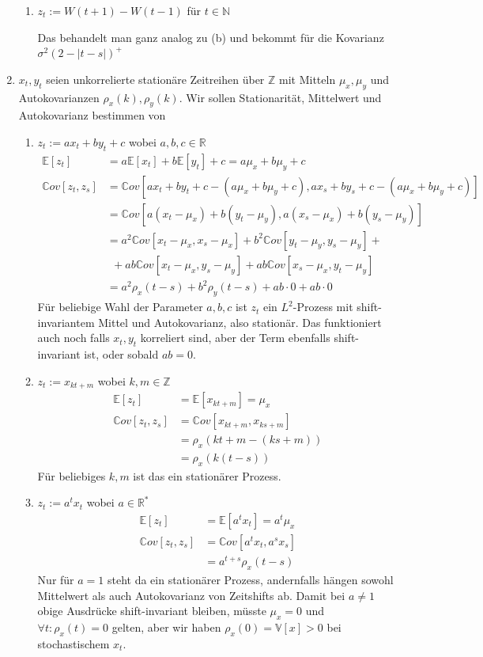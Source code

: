 \documentclass[a4paper,11pt,notitlepage,fullpage]{article}
\newcommand{\Ee}[1]{\mathbb E\left[#1\right]}
\newcommand{\Vv}[1]{\mathbb V\left[#1\right]}
\newcommand{\Cov}[1]{\mathbb Cov\left[#1\right]}
\begin{document}
\begin{enumerate}
\begin{enumerate}
\item $z_t := W(t+1)-W(t-1)$ für $t\in \mathbb{N}$

Das behandelt man ganz analog zu (b) und bekommt für die Kovarianz $\sigma^2 \left(2-|t-s| \right)^+$
\end{enumerate}


\item $x_t, y_t$ seien unkorrelierte stationäre Zeitreihen über $\mathbb{Z}$ mit Mitteln $\mu_x, \mu_y$ und Autokovarianzen $\rho_x(k), \rho_y(k)$. Wir sollen Stationarität, Mittelwert und Autokovarianz bestimmen von
\begin{enumerate}
\item $z_t := ax_t + by_t + c$ wobei $a,b,c \in \mathbb{R}$
\begin{align*}
\Ee{z_t} &= a\Ee{x_t}+ b\Ee{y_t} +c = a\mu_x + b\mu_y +c\\
\Cov{z_t, z_s} &= \Cov{ax_t + by_t +c - \left( a\mu_x+ b\mu_y +c\right),ax_s + by_s +c - \left( a\mu_x+ b\mu_y +c\right)}\\
&= \Cov{a(x_t-\mu_x) + b(y_t-\mu_y),a(x_s-\mu_x) + b(y_s-\mu_y)}\\
&= a^2\Cov{x_t-\mu_x,x_s-\mu_x} + b^2\Cov{y_t-\mu_y,y_s-\mu_y} + \\
&~~+ ab \Cov{x_t-\mu_x,y_s-\mu_y} +ab \Cov{x_s-\mu_x,y_t-\mu_y}\\
&= a^2 \rho_x(t-s) + b^2\rho_y(t-s) +ab\cdot 0 +ab\cdot 0
\end{align*}
Für beliebige Wahl der Parameter $a,b,c$ ist $z_t$ ein $L^2$-Prozess mit shift-invariantem Mittel und Autokovarianz, also stationär. Das funktioniert auch noch falls $x_t, y_t$ korreliert sind, aber der Term ebenfalls shift-invariant ist, oder sobald $ab=0$.

\item $z_t := x_{kt+m}$ wobei $k,m \in \mathbb{Z}$
\begin{align*}
\Ee{z_t} &= \Ee{x_{kt+m}} =\mu_x\\
\Cov{z_t, z_s} &= \Cov{x_{kt+m}, x_{ks+m}} \\
&=\rho_x(kt+m - (ks+m))\\
&=\rho_x(k(t-s))
\end{align*}
Für beliebiges $k,m$ ist das ein stationärer Prozess.

\item $z_t := a^tx_t$ wobei $a \in \mathbb{R}^*$
\begin{align*}
\Ee{z_t} &= \Ee{a^t x_t} = a^t\mu_x\\
\Cov{z_t, z_s} &= \Cov{a^t x_t, a^s x_s} \\
&= a^{t+s} \rho_x(t-s)
\end{align*}
Nur für $a=1$ steht da ein stationärer Prozess, andernfalls hängen sowohl Mittelwert als auch Autokovarianz von Zeitshifts ab. Damit bei $a\neq1$ obige Ausdrücke shift-invariant bleiben, müsste $\mu_x=0$ und $\forall t: \rho_x(t)=0$ gelten, aber wir haben $\rho_x(0)=\Vv{x}>0$ bei stochastischem $x_t$.


\end{enumerate}
\end{enumerate}
\end{document}
